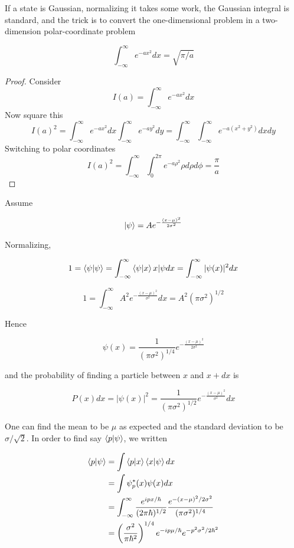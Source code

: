 \documentclass{tufte-book}
\newcommand{\infint}{\int^{\infty}_{-\infty}}
\begin{document}
If a state is Gaussian, normalizing it takes some work, the Gaussian integral is standard, and the trick is to convert the one-dimensional problem in a two-dimension polar-coordinate problem

\begin{equation}
	\label{eq:gauss}
	\infint e^{-ax^2}dx = \sqrt{\pi/a}
\end{equation}

\begin{proof}
	Consider
	\[
		I(a) = \infint e^{-ax^2}dx
	\]
	Now square this
	\[
		I(a)^2 = \infint e^{-ax^2}dx \infint e^{-ay^2}dy = \infint\infint e^{-a(x^2+y^2)}dxdy
	\]
	Switching to polar coordinates
	\[
		I(a)^2 = \infint \int^{2\pi}_{0}e^{-a\rho^2}\rho d\rho d\phi = \frac{\pi}{a}
	\]
\end{proof}

Assume

\begin{equation}
	\label{eq:38}
	\ket{\psi} = Ae^{-\frac{(x-\mu)^2}{2\sigma^2}}
\end{equation}

Normalizing,

\begin{equation}
	\label{eq:39}
	1 = \braket{\psi|\psi} = \infint \braket{\psi|x}{x|\psi}dx = \infint|\psi(x)|^2dx
\end{equation}

\begin{equation}
	\label{eq:40}
	1 = \infint A^2e^{-\frac{(x-\mu)^2}{\sigma^2}}dx = A^2(\pi\sigma^2)^{1/2}
\end{equation}

Hence

\begin{equation}
	\label{eq:41}
	\psi(x) = \frac{1}{(\pi\sigma^2)^{1/4}}e^{-\frac{(x-\mu)^2}{2\sigma^2}}
\end{equation}

and the probability of finding a particle between $x$ and $x + dx$ is

\begin{equation}
	\label{eq:42}
	P(x)dx = |\psi(x)|^2 = \frac{1}{(\pi\sigma^2)^{1/2}}e^{-\frac{(x-\mu)^2}{\sigma^2}}dx
\end{equation}

One can find the mean to be $\mu$ as expected and the standard deviation to be $\sigma/\sqrt{2}$. In order to find say $\braket{p|\psi}$, we written

\begin{align*}
	\braket{p|\psi} &= \int\braket{p|x}\braket{x|\psi}dx \\
	&= \int\psi^*_p(x)\psi(x)dx \\
	&= \infint \frac{e^{ipx/\hbar}}{(2\pi\hbar)^{1/2}}\frac{e^{-(x-\mu)^2/2\sigma^2}}{(\pi\sigma^2)^{1/4}} \\
	&= \left(\frac{\sigma^2}{\pi\hbar^2}\right)^{1/4}e^{-ip\mu/\hbar}e^{-p^2\sigma^2/2\hbar^2}
\end{align*}
\end{document}
